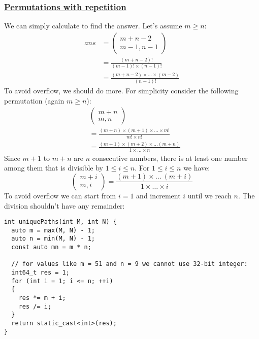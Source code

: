 \documentclass{book}
\begin{document}
	\subsubsection{\href{https://en.wikipedia.org/wiki/Permutation\#Permutations_with_repetition}{Permutations with repetition}}
	We can simply calculate to find the answer. Let's assume $m \ge n$:
	\begin{equation*}
		\begin{split}
		ans &= \begin{pmatrix}
			m + n - 2 \\
			m - 1,n - 1
		\end{pmatrix} \\
		&= \frac{(m + n -2)!}{(m - 1)! \times (n - 1)!} \\
		&= \frac{(m + n - 2) \times \dots \times (m - 2)}{(n - 1)!}
		\end{split}
	\end{equation*}
	To avoid overflow, we should do more. For simplicity consider the following permutation (again $m \ge n$):
	\begin{equation*}
		\begin{split}
			&\begin{pmatrix}
				m + n \\
				m, n				
			\end{pmatrix} \\
		&= \frac{(m + n) \times (m + 1) \times \dots \times m!}{m! \times n!} \\
		&= \frac{(m + 1) \times (m + 2) \times \dots (m + n)}{1 \times \dots \times n}
		\end{split}
	\end{equation*}
	Since $m + 1$ to $m + n$ are $n$ consecutive numbers, there is at least one number among them that is divisible by $1 \le i \le n$. For $1 \le i \le n$ we have:
	\begin{equation*}
		\begin{pmatrix}
			m + i \\
			m, i
		\end{pmatrix} = \frac{(m + 1) \times \dots \ (m + i)}{1 \times \dots \times i}
	\end{equation*}
	To avoid overflow we can start from $i=1$ and increment $i$ until we reach $n$. The division shouldn't have any remainder:
	\begin{lstlisting}
int uniquePaths(int M, int N) {
  auto m = max(M, N) - 1;
  auto n = min(M, N) - 1;
  const auto mn = m * n;
  
  // for values like m = 51 and n = 9 we cannot use 32-bit integer:
  int64_t res = 1;
  for (int i = 1; i <= n; ++i)
  {
    res *= m + i;
    res /= i;
  }
  return static_cast<int>(res);
}
	\end{lstlisting}
\end{document}
